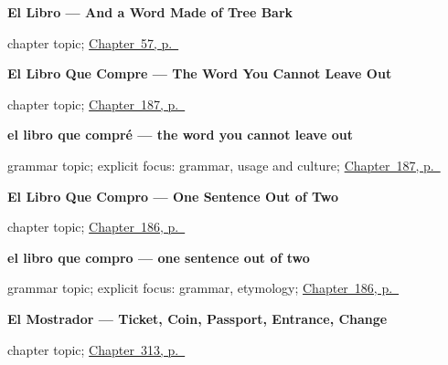 \noindent\begin{minipage}[t]{\linewidth}
\raggedright
\textbf{El Libro --- And a Word Made of Tree Bark}\par
\footnotesize chapter topic; \hyperref[ch:noun-libro]{Chapter~57, p.~\pageref*{ch:noun-libro}}
\end{minipage}\par\smallskip

\noindent\begin{minipage}[t]{\linewidth}
\raggedright
\textbf{El Libro Que Compre --- The Word You Cannot Leave Out}\par
\footnotesize chapter topic; \hyperref[ch:relative-obligatory]{Chapter~187, p.~\pageref*{ch:relative-obligatory}}
\end{minipage}\par\smallskip

\noindent\begin{minipage}[t]{\linewidth}
\raggedright
\textbf{el libro que compré — the word you cannot leave out}\par
\footnotesize grammar topic; explicit focus: grammar, usage and culture; \hyperref[ch:relative-obligatory]{Chapter~187, p.~\pageref*{ch:relative-obligatory}}
\end{minipage}\par\smallskip

\noindent\begin{minipage}[t]{\linewidth}
\raggedright
\textbf{El Libro Que Compro --- One Sentence Out of Two}\par
\footnotesize chapter topic; \hyperref[ch:relative-que]{Chapter~186, p.~\pageref*{ch:relative-que}}
\end{minipage}\par\smallskip

\noindent\begin{minipage}[t]{\linewidth}
\raggedright
\textbf{el libro que compro — one sentence out of two}\par
\footnotesize grammar topic; explicit focus: grammar, etymology; \hyperref[ch:relative-que]{Chapter~186, p.~\pageref*{ch:relative-que}}
\end{minipage}\par\smallskip

\noindent\begin{minipage}[t]{\linewidth}
\raggedright
\textbf{El Mostrador --- Ticket, Coin, Passport, Entrance, Change}\par
\footnotesize chapter topic; \hyperref[ch:el-mostrador]{Chapter~313, p.~\pageref*{ch:el-mostrador}}
\end{minipage}\par\smallskip

